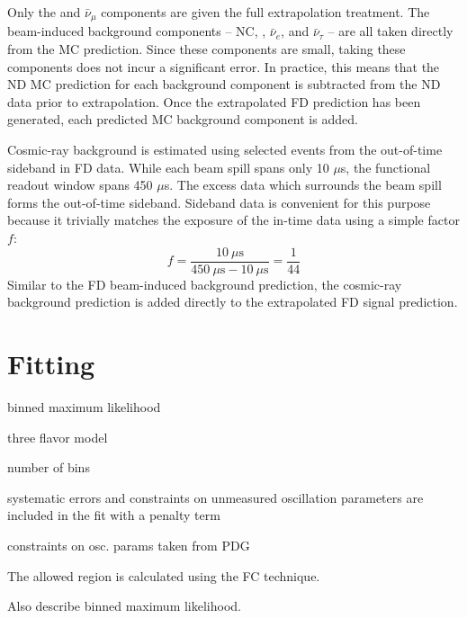 Only the \numu and $\bar{\nu}_\mu$ components are given the full extrapolation
treatment.
The beam-induced background components -- NC, \nue, $\bar{\nu}_e$, \nutau and
$\bar{\nu}_\tau$ -- are all taken directly from the MC prediction.
Since these components are small, taking these components does not incur
a significant error.
In practice, this means that the ND MC prediction for each background component
is subtracted from the ND data prior to extrapolation.
Once the extrapolated FD prediction has been generated, each predicted MC
background component is added.


Cosmic-ray background is estimated using selected events from the out-of-time
sideband in FD data.
While each \numi beam spill spans only 10 $\mu$s, the functional readout window
spans 450 $\mu$s.
The excess data which surrounds the beam spill forms the out-of-time sideband.
Sideband data is convenient for this purpose because it trivially
matches the exposure of the in-time data using a simple factor $f$:
\begin{equation}
f = \frac{10~\mu\text{s}}{ 450~\mu\text{s} - 10~\mu\text{s}} = \frac{1}{44}
\end{equation}
Similar to the FD beam-induced background prediction, the cosmic-ray
background prediction is added directly to the extrapolated FD signal
prediction.


\section{Fitting}
\label{fitting_section}

binned maximum likelihood

three flavor model

number of bins

systematic errors and constraints on unmeasured oscillation parameters
are included in the fit with a penalty term

constraints on osc. params taken from PDG

The allowed region is calculated using the FC technique.

Also describe binned maximum likelihood.



